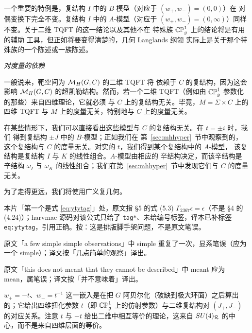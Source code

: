 一个重要的特例是，复结构 $I$ 中的 $B$-模型（对应于 $(w_+,w_-)=(0,0)$）在
对偶变换下完全不变。复结构 $I$ 中的 $A$-模型（对应于
$(w_+,w_-)=(0,\infty)$）同样不变。关于二维 TQFT 的这一结论以及其他不在
特殊族 $\Bbb{CP}^1_g$ 上的结论将是有用的辅助
工具，但正如将要变得清楚的，几何 Langlands 纲领
实际上是关于那个特殊族的一个陈述或一族陈述。

\par\medskip\emph{对度量的依赖}

一般说来，靶空间为 $\MH(G,C)$ 的二维 TQFT 将
依赖于 $C$ 的复结构，因为这会影响
$\MH(G,C)$ 的超凯勒结构。然而，若一个二维 TQFT（例如由
$\Bbb{CP}^1_g$ 参数化的那些）来自四维理论，它就必须
与 $C$ 上的复结构无关。毕竟，$M=\Sigma\times C$ 上的
四维 TQFT 与 $M$ 上的度量无关，特别地与 $C$ 上的度量无关。

在某些情形下，我们可以直接看出这些模型与 $C$ 的复结构无关。在 $t=\pm i$ 时，我们
得到复结构 $\pm J$ 中的 $B$-模型；正如我们在
第~\ref{sec:mhhyper}~节中观察到的，这个复结构与 $C$ 的度量无关。对实的 $t$，我们得到某个复结构中的 $A$-模型，
该复结构是复结构 $I$ 与 $K$ 的线性组合。$A$-模型由相应的
辛结构决定，而该辛结构是辛结构 $\omega_I$ 与 $\omega_K$ 的线性组合；我们在第~\ref{sec:mhhyper}~节中发现它们与 $C$ 的度量无关。

为了走得更远，我们将使用广义复几何。

\begin{yizhu}[原文疑误]
本片「第一个是式 \eqref{eq:ytytag}」处，原文指 §5 的式 (5.3) $\Gamma_{2367}\epsilon=\epsilon$（不是 §4 的 (4.24)）；harvmac 源码对该公式只给了 \texttt{tag*}、未给编号标签，译本已补标签 \texttt{eq:ytytag}，引用正确。按：这是排版脚手架问题，不是原文笔误。
\end{yizhu}

\begin{yizhu}[原文疑误]
原文「a few simple simple observations」中 simple 重复了一次，显系笔误（应为一个 simple）；译文按「几点简单的观察」译出。
\end{yizhu}

\begin{yizhu}[原文疑误]
原文「this does not meant that they cannot be described」中 meant 应为 mean，属笔误；译文按「并不意味着」译出。
\end{yizhu}

\begin{yizhu}[易错点]
$w_+=-t$、$w_-=t^{-1}$ 这一嵌入是在把 $G$ 阿贝尔化（破缺到极大环面）之后算出的；它给出四维扭化参数 $t$（即 $\Bbb{CP}^1_g$ 上的仿射参数）与二维复结构对 $(J_+,J_-)$ 的对应关系。注意 $t$ 与 $-t$ 给出二维中相互等价的理论，这来自 $SU(4)_{\cal R}$ 的中心，而不是来自四维层面的等价。
\end{yizhu}

